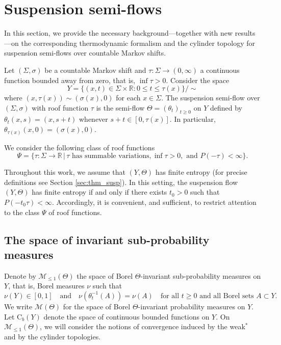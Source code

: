 \documentclass[letterpaper,11pt]{amsart}
\numberwithin{equation}{section}     %
\newcommand{\M}{\mathcal{M}}
\newcommand{\R}{\mathbb{R}}
\def\R{{\mathbb R}}
\def\M{{\mathcal M}}
\def\le{\leqslant}
\def\ge{\geqslant}
\def\M{\mathcal{M}}
\begin{document}
\section{Suspension semi-flows}\label{sec:sus}


In this section, we provide the necessary background—together with new results—on the corresponding thermodynamic formalism and the cylinder topology for suspension semi-flows over countable Markov shifts.

Let $(\Sigma, \sigma)$ be  a countable Markov shift and $\tau: \Sigma \to (0,\infty)$  a continuous function bounded away from zero, that is, $\inf \tau>0$. Consider the space
\begin{equation*}\label{eq:flow phase }
Y= \{ (x,t)\in \Sigma  \times \R \colon 0 \le t \le\tau(x)\}/\sim
\end{equation*}
where $(x,\tau(x))\sim (\sigma(x),0)$ for
each $x\in \Sigma $. The suspension semi-flow over $(\Sigma,\sigma)$
with roof function $\tau$ is the semi-flow $\Theta = (\theta_t)_{t \ge 0}$ on $Y$ defined by
$\theta_t(x,s)= (x,s+t)$ whenever $s+t\in[0,\tau(x)]$. In particular, $ \theta_{\tau(x)}(x,0)= (\sigma(x),0)$. 

We consider the following class of roof functions
$$\Psi=\{\tau:\Sigma\to\R \,| \,\tau \text{ has summable variations}, \inf\tau>0, \text{ and }P(-\tau)<\infty\}.$$

Throughout this work, we assume that $(Y,\Theta)$ has finite entropy (for precise definitions see Section \ref{sec:thm_susp}).  In this setting,  the suspension flow $(Y,\Theta)$ has finite entropy if and only if there exists $t_0>0$ such that $P(-t_0\tau)<\infty$. Accordingly, it is convenient, and sufficient, to restrict attention to the class $\Psi$ of roof functions. 









\subsection{The space of invariant sub-probability measures} \label{sm}

Denote by $\M_{\leq 1}(\Theta)$ the space of Borel $\Theta$-invariant sub-probability measures on $Y$, that is, Borel measures $\nu$ such that 
\[
\nu(Y)\in[0,1]
\quad \text{and} \quad 
\nu(\theta_t^{-1}(A))=\nu(A) \quad \text{for all } t\geq 0 \text{ and all Borel sets } A\subset Y.
\]
We write $\M(\Theta)$ for the space of Borel $\Theta$-invariant probability measures on $Y$. Let $\text{C}_b(Y)$ denote the space of continuous bounded functions on $Y$.  On $\M_{\leq 1}(\Theta)$, we will consider the notions of convergence induced by the weak$^\ast$ and by the cylinder topologies.
\end{document}
